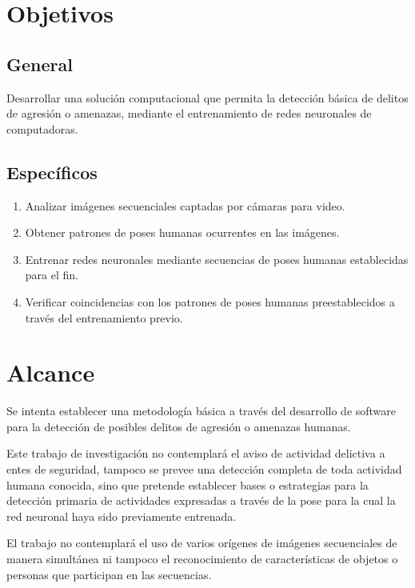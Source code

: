 \documentclass[a4paper,12pt,oneside,spanish]{book}
\begin{document}
\section{Objetivos}
\subsection{General}
Desarrollar una solución computacional que permita la detección básica de delitos de agresión o amenazas, mediante el entrenamiento de redes neuronales de computadoras.\par 

\subsection{Específicos}
\begin{enumerate}
	\baselineskip 16pt
	\item Analizar imágenes secuenciales captadas por cámaras para video.\par 
	\item Obtener patrones de poses humanas ocurrentes en las imágenes.\par 
	\item Entrenar redes neuronales mediante secuencias de poses humanas establecidas para el fin.\par 
	\item Verificar coincidencias con los patrones de poses humanas preestablecidos a través del entrenamiento previo.\par 
\end{enumerate}

\section{Alcance}
Se intenta establecer una metodología básica a través del desarrollo de software para la detección de posibles delitos de agresión o amenazas humanas.\par

Este trabajo de investigación no contemplará el aviso de actividad delictiva a entes de seguridad, tampoco se prevee una detección completa de toda actividad humana conocida, sino que pretende establecer bases o estrategias para la detección primaria de  actividades expresadas a través de la pose para la cual la red neuronal haya sido previamente entrenada.\par

El trabajo no contemplará el uso de varios orígenes de imágenes secuenciales de manera simultánea ni tampoco el reconocimiento de características de objetos o personas que participan en las secuencias.\par
\end{document}
